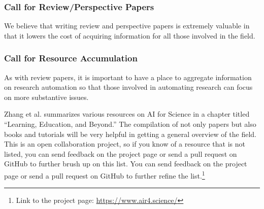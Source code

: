 \subsubsection{Call for Review/Perspective Papers}

We believe that writing review and perspective papers is extremely valuable in that it lowers the cost of acquiring information for all those involved in the field.


\subsubsection{Call for Resource Accumulation}
As with review papers, it is important to have a place to aggregate information on research automation so that those involved in automating research can focus on more substantive issues.

Zhang et al. summarizes various resources on AI for Science in a chapter titled ``Learning, Education, and Beyond.'' \cite{zhang2023artificial} The compilation of not only papers but also books and tutorials will be very helpful in getting a general overview of the field. This is an open collaboration project, so if you know of a resource that is not listed, you can send feedback on the project page or send a pull request on GitHub to further brush up on this list. You can send feedback on the project page or send a pull request on GitHub to further refine the list.\footnote{
Link to the project page: \href{https://www.air4.science/}{https://www.air4.science/}
}  

